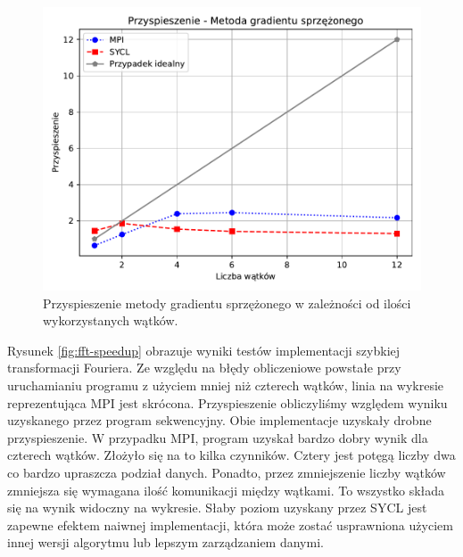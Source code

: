\documentclass[a4paper,12pt]{book} %
\begin{document}
\begin{figure}
	\centering
	\includegraphics[scale=1]{assets/przyspieszenie_cg.pdf}
	\caption{Przyspieszenie metody gradientu sprzężonego w zależności od ilości wykorzystanych wątków.}
	\label{fig:cg-speedup}
\end{figure}

Rysunek \ref{fig:fft-speedup} obrazuje wyniki testów implementacji szybkiej transformacji Fouriera. Ze względu na błędy obliczeniowe powstałe przy uruchamianiu programu z użyciem mniej niż czterech wątków, linia na wykresie reprezentująca MPI jest skrócona. Przyspieszenie obliczyliśmy względem wyniku uzyskanego przez program sekwencyjny. Obie implementacje uzyskały drobne przyspieszenie. W przypadku MPI, program uzyskał bardzo dobry wynik dla czterech wątków. Złożyło się na to kilka czynników. Cztery jest potęgą liczby dwa co bardzo upraszcza podział danych. Ponadto, przez zmniejszenie liczby wątków zmniejsza się wymagana ilość komunikacji między wątkami. To wszystko składa się na wynik widoczny na wykresie. Słaby poziom uzyskany przez SYCL jest zapewne efektem naiwnej implementacji, która może zostać usprawniona użyciem innej wersji algorytmu lub lepszym zarządzaniem danymi.
\end{document}
